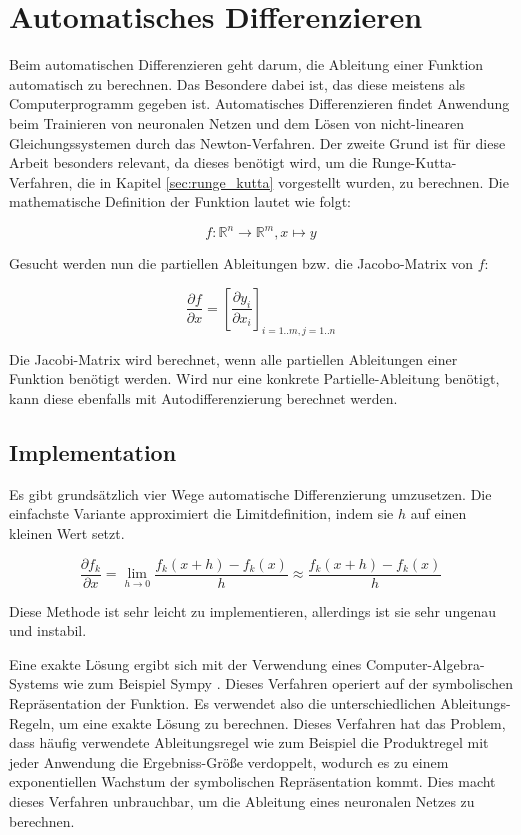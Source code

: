 
\section{Automatisches Differenzieren} \label{sec:auto_diffentiation}

Beim automatischen Differenzieren \cite[Kapitel~2]{autodiff} geht darum, die Ableitung einer Funktion automatisch zu berechnen.
Das Besondere dabei ist, das diese meistens als Computerprogramm gegeben ist.
Automatisches Differenzieren findet Anwendung beim Trainieren von neuronalen Netzen 
und dem Lösen von nicht-linearen Gleichungssystemen durch das Newton-Verfahren.
Der zweite Grund ist für diese Arbeit besonders relevant, da 
dieses benötigt wird, um die Runge-Kutta-Verfahren, die in Kapitel \ref{sec:runge_kutta} vorgestellt wurden, zu berechnen.
Die mathematische Definition der Funktion lautet wie folgt:

$$
f: \mathbb{R}^n \rightarrow \mathbb{R}^m, x \mapsto y
$$

Gesucht werden nun die partiellen Ableitungen bzw. die Jacobo-Matrix von $f$:

$$
\frac{\partial f}{\partial x} = \left[ \frac{\partial y_i}{\partial x_i} \right]_{i=1..m, j=1..n} 
$$

Die Jacobi-Matrix wird berechnet, wenn alle partiellen Ableitungen einer Funktion benötigt werden.
Wird nur eine konkrete Partielle-Ableitung benötigt, kann diese ebenfalls mit Autodifferenzierung berechnet werden.

\subsection{Implementation} \label{sec:implementation}

Es gibt grundsätzlich vier Wege automatische Differenzierung umzusetzen.
Die einfachste Variante approximiert die Limitdefinition, indem sie $h$ auf einen kleinen Wert setzt.

$$
\frac{\partial f_k}{\partial x} = \lim_{h \to 0} \frac{f_k(x+ h) - f_k(x)}{h} \approx \frac{f_k(x + h) - f_k(x)}{h} 
$$

Diese Methode ist sehr leicht zu implementieren, allerdings ist sie sehr ungenau und instabil.

Eine exakte Lösung ergibt sich mit der Verwendung eines Computer-Algebra-Systems wie zum Beispiel Sympy \cite{sympy}.
Dieses Verfahren operiert auf der symbolischen Repräsentation der Funktion.
Es verwendet also die unterschiedlichen Ableitungs-Regeln, um eine exakte Lösung zu berechnen.
Dieses Verfahren hat das Problem, dass häufig verwendete Ableitungsregel wie zum Beispiel die Produktregel
mit jeder Anwendung die Ergebniss-Größe verdoppelt, wodurch es zu einem exponentiellen Wachstum 
der symbolischen Repräsentation kommt.
Dies macht dieses Verfahren unbrauchbar, um die Ableitung eines neuronalen Netzes zu berechnen.

